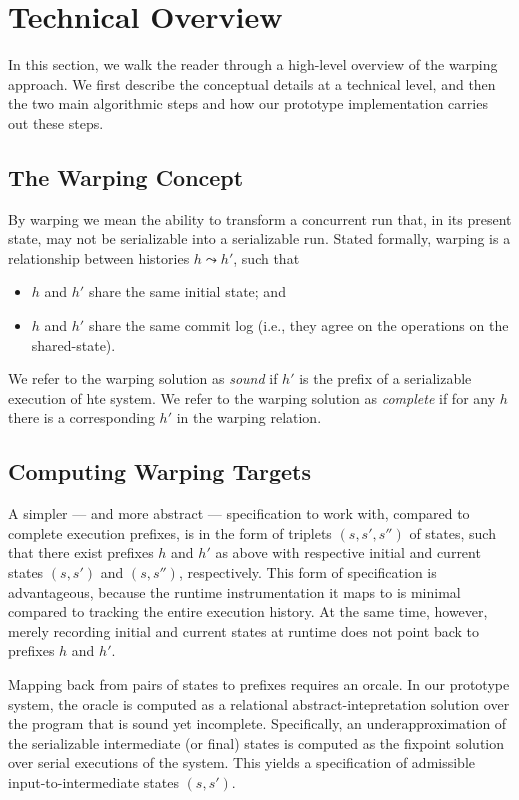 \section{Technical Overview}

In this section, we walk the reader through a high-level overview of the warping approach. We first describe the conceptual details at a technical level, and then the two main algorithmic steps and how our prototype implementation carries out these steps.

\subsection{The Warping Concept}

By warping we mean the ability to transform a concurrent run that, in its present state, may not be serializable into a serializable run. Stated formally, warping is a relationship between histories $h \leadsto h'$, such that
\begin{itemize}
	\item $h$ and $h'$ share the same initial state; and
	\item $h$ and $h'$ share the same commit log (i.e., they agree on the operations on the shared-state).
\end{itemize} 

We refer to the warping solution as \emph{sound} if $h'$ is the prefix of a serializable execution of hte system. We refer to the warping solution as \emph{complete} if for any $h$ there is a corresponding $h'$ in the warping relation.

\subsection{Computing Warping Targets}

A simpler --- and more abstract --- specification to work with, compared to complete execution prefixes, is in the form of triplets $(s,s',s'')$ of states, such that there exist prefixes $h$ and $h'$ as above with respective initial and current states $(s,s')$ and $(s,s'')$, respectively. This form of specification is advantageous, because the runtime instrumentation it maps to is minimal compared to tracking the entire execution history. At the same time, however, merely recording initial and current states at runtime does not point back to prefixes $h$ and $h'$.

Mapping back from pairs of states to prefixes requires an orcale. In our prototype system, the oracle is computed as a relational abstract-intepretation solution over the program that is sound yet incomplete. Specifically, an underapproximation of the serializable intermediate (or final) states is computed as the fixpoint solution over serial executions of the system. This yields a specification of admissible input-to-intermediate states $(s,s')$.

